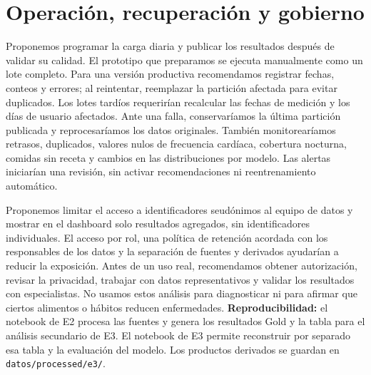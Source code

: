 \documentclass[11pt]{article}
\begin{document}
\section{Operación, recuperación y gobierno}
Proponemos programar la carga diaria y publicar los resultados después de validar su calidad. El prototipo que preparamos se ejecuta manualmente como un lote completo. Para una versión productiva recomendamos registrar fechas, conteos y errores; al reintentar, reemplazar la partición afectada para evitar duplicados. Los lotes tardíos requerirían recalcular las fechas de medición y los días de usuario afectados. Ante una falla, conservaríamos la última partición publicada y reprocesaríamos los datos originales. También monitorearíamos retrasos, duplicados, valores nulos de frecuencia cardíaca, cobertura nocturna, comidas sin receta y cambios en las distribuciones por modelo. Las alertas iniciarían una revisión, sin activar recomendaciones ni reentrenamiento automático.

Proponemos limitar el acceso a identificadores seudónimos al equipo de datos y mostrar en el dashboard solo resultados agregados, sin identificadores individuales. El acceso por rol, una política de retención acordada con los responsables de los datos y la separación de fuentes y derivados ayudarían a reducir la exposición. Antes de un uso real, recomendamos obtener autorización, revisar la privacidad, trabajar con datos representativos y validar los resultados con especialistas. No usamos estos análisis para diagnosticar ni para afirmar que ciertos alimentos o hábitos reducen enfermedades.
\textbf{Reproducibilidad:} el notebook de E2 procesa las fuentes y genera los resultados Gold y la tabla para el análisis secundario de E3. El notebook de E3 permite reconstruir por separado esa tabla y la evaluación del modelo. Los productos derivados se guardan en \texttt{datos/processed/e3/}.
\end{document}

